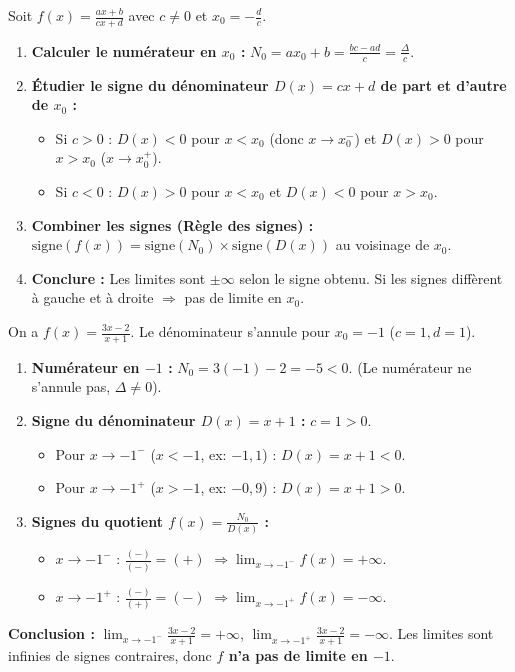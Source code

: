 \documentclass[11pt]{article}
\begin{document}
\begin{methode}[Déterminer les limites d'une homographie en son point d'exclusion $x_0 = -d/c$]
Soit $f(x) = \frac{ax+b}{cx+d}$ avec $c \neq 0$ et $x_0 = -\frac{d}{c}$.
\begin{enumerate}
    \item \textbf{Calculer le numérateur en $x_0$ :} $N_0 = ax_0 + b = \frac{bc-ad}{c} = \frac{\Delta}{c}$.
    \item \textbf{Étudier le signe du dénominateur $D(x) = cx+d$ de part et d'autre de $x_0$ :}
    \begin{itemize}
        \item Si $c > 0$ : $D(x) < 0$ pour $x < x_0$ (donc $x \to x_0^{-}$) et $D(x) > 0$ pour $x > x_0$ ($x \to x_0^{+}$).
        \item Si $c < 0$ : $D(x) > 0$ pour $x < x_0$ et $D(x) < 0$ pour $x > x_0$.
    \end{itemize}
    \item \textbf{Combiner les signes (Règle des signes) :} $\text{signe}(f(x)) = \text{signe}(N_0) \times \text{signe}(D(x))$ au voisinage de $x_0$.
    \item \textbf{Conclure :} Les limites sont $\pm \infty$ selon le signe obtenu. Si les signes diffèrent à gauche et à droite $\Rightarrow$ pas de limite en $x_0$.
\end{enumerate}
\end{methode}

\begin{exoresolu}[Limites de $f(x) = \frac{3x-2}{x+1}$ en $-1^{-}$ et $-1^{+}$]
On a $f(x) = \frac{3x-2}{x+1}$. Le dénominateur s'annule pour $x_0 = -1$ ($c=1, d=1$).
\begin{enumerate}
    \item \textbf{Numérateur en $-1$ :} $N_0 = 3(-1) - 2 = -5 < 0$. (Le numérateur ne s'annule pas, $\Delta \neq 0$).
    \item \textbf{Signe du dénominateur $D(x) = x+1$ :} $c=1 > 0$.
    \begin{itemize}
        \item Pour $x \to -1^{-}$ ($x < -1$, ex: $-1,1$) : $D(x) = x+1 < 0$.
        \item Pour $x \to -1^{+}$ ($x > -1$, ex: $-0,9$) : $D(x) = x+1 > 0$.
    \end{itemize}
    \item \textbf{Signes du quotient $f(x) = \frac{N_0}{D(x)}$ :}
    \begin{itemize}
        \item $x \to -1^{-}$ : $\frac{(-)}{(-)} = (+)$ $\Rightarrow \lim_{x \to -1^{-}} f(x) = +\infty$.
        \item $x \to -1^{+}$ : $\frac{(-)}{(+)} = (-)$ $\Rightarrow \lim_{x \to -1^{+}} f(x) = -\infty$.
    \end{itemize}
\end{enumerate}
\textbf{Conclusion :} $\lim_{x \to -1^{-}} \frac{3x-2}{x+1} = +\infty$, $\lim_{x \to -1^{+}} \frac{3x-2}{x+1} = -\infty$. Les limites sont infinies de signes contraires, donc \textbf{$f$ n'a pas de limite en $-1$}.
\end{exoresolu}
\end{document}
